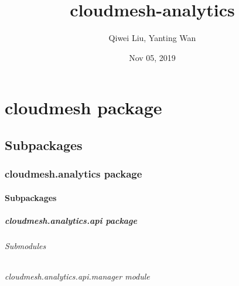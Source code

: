 \documentclass[letterpaper,10pt,english]{sphinxmanual}
\title{cloudmesh-analytics}
\date{Nov 05, 2019}
\author{Qiwei Liu, Yanting Wan}
\begin{document}
\pagestyle{empty}
\sphinxmaketitle
\pagestyle{plain}
\sphinxtableofcontents
\pagestyle{normal}
\label{\detokenize{index::doc}}



\chapter{cloudmesh package}
\label{\detokenize{cloudmesh:cloudmesh-package}}\label{\detokenize{cloudmesh::doc}}

\section{Subpackages}
\label{\detokenize{cloudmesh:subpackages}}

\subsection{cloudmesh.analytics package}
\label{\detokenize{cloudmesh.analytics:cloudmesh-analytics-package}}\label{\detokenize{cloudmesh.analytics::doc}}

\subsubsection{Subpackages}
\label{\detokenize{cloudmesh.analytics:subpackages}}

\paragraph{cloudmesh.analytics.api package}
\label{\detokenize{cloudmesh.analytics.api:cloudmesh-analytics-api-package}}\label{\detokenize{cloudmesh.analytics.api::doc}}

\subparagraph{Submodules}
\label{\detokenize{cloudmesh.analytics.api:submodules}}

\subparagraph{cloudmesh.analytics.api.manager module}
\label{\detokenize{cloudmesh.analytics.api:module-cloudmesh.analytics.api.manager}}\label{\detokenize{cloudmesh.analytics.api:cloudmesh-analytics-api-manager-module}}
\end{document}

